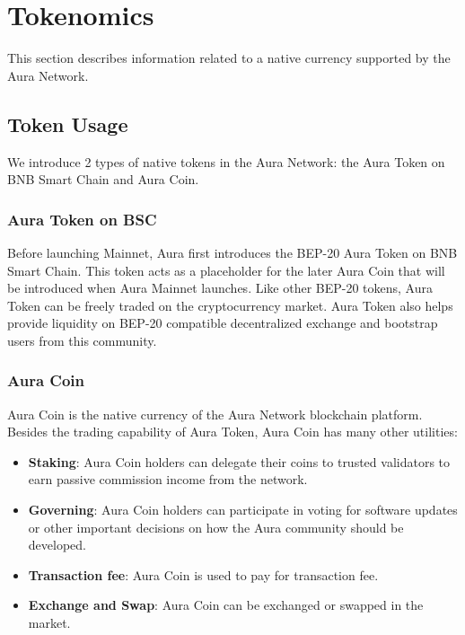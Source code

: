 \documentclass[11pt, titlepage]{article}
\begin{document}
\section{Tokenomics}

This section describes information related to a native currency supported by the Aura Network.

\subsection{Token Usage}
We introduce 2 types of native tokens in the Aura Network: the Aura Token on BNB Smart Chain and Aura Coin.

\subsubsection{Aura Token on BSC}

Before launching Mainnet, Aura first introduces the BEP-20 Aura Token on BNB Smart Chain. This token acts as a placeholder for the later Aura Coin that will be introduced when Aura Mainnet launches. Like other BEP-20 tokens, Aura Token can be freely traded on the cryptocurrency market. Aura Token also helps provide liquidity on BEP-20 compatible decentralized exchange and bootstrap users from this community.

\subsubsection{Aura Coin}
Aura Coin is the native currency of the Aura Network blockchain platform. Besides the trading capability of Aura Token, Aura Coin has many other utilities:

\begin{itemize}
    \item \textbf{Staking}: Aura Coin holders can delegate their coins to trusted validators to earn passive commission income from the network.
    \item \textbf{Governing}: Aura Coin holders can participate in voting for software updates or other important decisions on how the Aura community should be developed.
    \item \textbf{Transaction fee}: Aura Coin is used to pay for transaction fee.
    \item \textbf{Exchange and Swap}: Aura Coin can be exchanged or swapped in the market.
\end{itemize}
\end{document}
